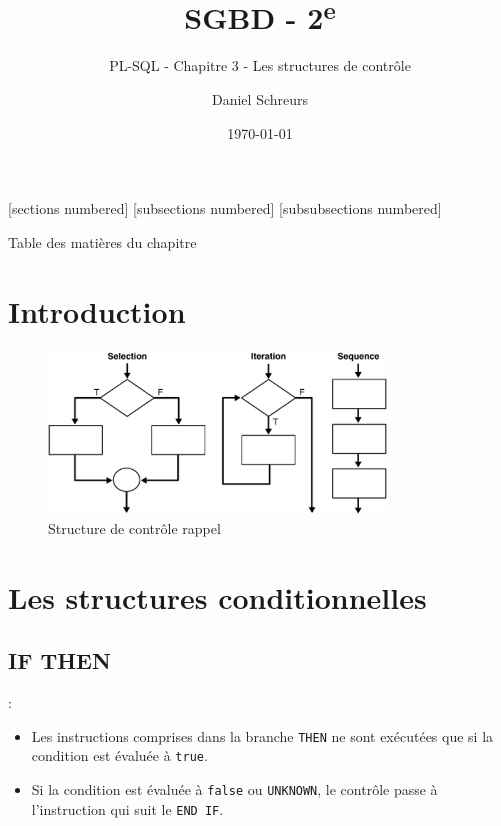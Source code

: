 \documentclass[10pt]{beamer}
\title{SGBD - 2\textsuperscript{e}}
\subtitle{PL-SQL - Chapitre 3 - Les structures de contrôle}
\date{\today}
\author{Daniel Schreurs}
\institute{Haute École de Province de Liège}
\begin{document}
\maketitle

[sections numbered]
[subsections numbered]
[subsubsections numbered]
\begin{frame}[allowframebreaks]{Table des matières du chapitre}
    \tableofcontents[subsectionstyle=show/show/hide,subsubsectionstyle=show/show/hide,]
\end{frame}

\section{Introduction}
\tocss
\begin{frame}{\secname}
    \begin{figure}
        \begin{center}
            \includegraphics[width=0.8\textwidth]{../assets/img/structure-controle-rappel.png}
            \caption{Structure de contrôle rappel}
        \end{center}
    \end{figure}
\end{frame}

\section{Les structures conditionnelles}
\tocss
\subsection{IF THEN}
\begin{frame}{\secname : \subsecname}
    \begin{itemize}
        \item   Les instructions comprises dans la branche \lstinline[language=plsql]!THEN! ne sont exécutées que si la condition est évaluée à \lstinline[language=plsql]!true!.
        \item Si la condition est évaluée à \lstinline[language=plsql]!false! ou \lstinline[language=plsql]!UNKNOWN!, le contrôle passe à l'instruction qui suit le \lstinline[language=plsql]!END IF!.
    \end{itemize}
\end{frame}
\end{document}
